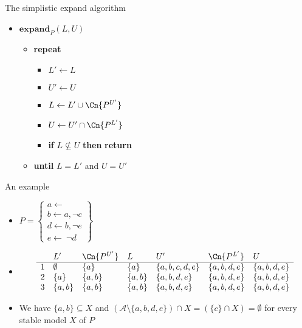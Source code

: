 \begin{frame}{The simplistic expand algorithm}
  \bigskip
  \begin{itemize}
  \item[] $\mathbf{expand}_{P}(L,U)$ \
    \begin{itemize}\normalsize
    \item[] \textbf{repeat} \
      \begin{itemize}\normalsize
      \item [] $L'\leftarrow L$
      \item [] $U'\leftarrow U$
        \smallskip
      \item [] $L\leftarrow L'\cup\Cn{P^{U'}}$
      \item [] $U\leftarrow U'\cap\Cn{P^{L'}}$
        \smallskip
      \item [] \textbf{if} $L\not\subseteq U$ \textbf{then} \textbf{return}
        \smallskip
      \end{itemize}
    \item[]\textbf{until} $L=L'$ and $U=U'$
    \end{itemize}
  \end{itemize}
\end{frame}
\begin{frame}{An example}
\begin{itemize}
\item<1-> []
\(
P
=
\left\{
  \begin{array}{l}
    a\leftarrow\\  b\leftarrow a,\neg c\\ d\leftarrow b,\neg e\\ e\leftarrow~\neg d
  \end{array}
\right\}
\)
\item<2-> []
\[
\begin{array}{cllllll}
  & L'        & \Cn{P^{U'}} & L       & U'            & \Cn{P^{L'}} & U          \\
\hline
1 & \emptyset & \{a\}         & \{a\}   &\{a,b,c,d,e\}  & \{a,b,d,e\}   & \{a,b,d,e\}\\
2 & \{a\}     & \{a,b\}       & \{a,b\} &\{a,b,d,e\}    & \{a,b,d,e\}   & \{a,b,d,e\}\\
3 & \{a,b\}   & \{a,b\}       & \{a,b\} & \{a,b,d,e\}   & \{a,b,d,e\}   & \{a,b,d,e\}\\
\end{array}
\]
\medskip
\item<3->  We have $\{a,b\}\subseteq X$ and
  $(\mathcal{A}\setminus\{a,b,d,e\})\cap X= (\{c\}\cap X)=\emptyset$
  for every stable model $X$ of $P$
\end{itemize}
\end{frame}
